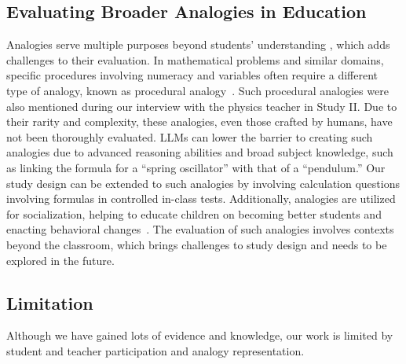 \subsection{Evaluating Broader Analogies in Education}
Analogies serve multiple purposes beyond students' understanding , which adds challenges to their evaluation.
In mathematical problems and similar domains, specific procedures involving numeracy and variables often require a different type of analogy, known as procedural analogy~\cite{richland_analogy_2004}. 
Such procedural analogies were also mentioned during our interview with the physics teacher in Study II. 
Due to their rarity and complexity, these analogies, even those crafted by humans, have not been thoroughly evaluated.
LLMs can lower the barrier to creating such analogies due to advanced reasoning abilities and broad subject knowledge, such as linking the formula for a ``spring oscillator'' with that of a ``pendulum.'' 
Our study design can be extended to such analogies by involving calculation questions involving formulas in controlled in-class tests.
Additionally, analogies are utilized for socialization, helping to educate children on becoming better students and enacting behavioral changes~\cite{richland_analogy_2004}.
The evaluation of such analogies involves contexts beyond the classroom, which brings challenges to study design and needs to be explored in the future.

\subsection{Limitation}
Although we have gained lots of evidence and knowledge, our work is limited by student and teacher participation and analogy representation.

